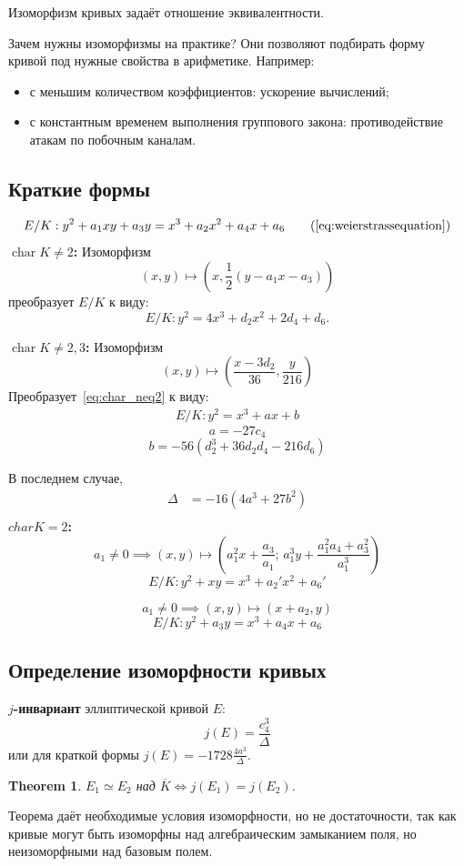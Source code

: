 \documentclass[11pt]{exam}
\newtheorem{theorem}{Theorem}[section]
\theoremstyle{definition}
\begin{document}
{Изоморфизм кривых задаёт отношение эквивалентности.

Зачем нужны изоморфизмы на практике? Они позволяют подбирать форму кривой под нужные свойства в арифметике. Например:
\begin{itemize}
	\item с меньшим количеством коэффициентов: ускорение вычислений;
	\item с константным временем выполнения группового закона: противодействие атакам по побочным каналам.
\end{itemize}

\subsection{Краткие формы}
    \begin{equation*}
	E/K: y^2 + a_1 xy + a_3 y = x^3 + a_2 x^2 + a_4 x + a_6 \tag{\ref{eq:weierstrassequation}}
\end{equation*}
\textbf{$\operatorname{char} K \neq 2$:}
Изоморфизм \[(x, y)\mapsto \left(x, \frac{1}{2}(y-a_1x-a_3)\right)\] преобразует $E/K$ к виду:
\begin{equation}
	\label{eq:char_neq2}
	E/K: y^2 = 4x^3 + d_2x^2 + 2d_4 + d_6.
\end{equation}

\textbf{$\operatorname{char} K \neq 2, 3$:}
Изоморфизм
\[
(x, y) \mapsto \left(\frac{x-3d_2}{36}, \frac{y}{216}\right)
\]
Преобразует~\eqref{eq:char_neq2} к виду:
\begin{align}
	E/K: y^2 = x^3 + ax + b
\end{align}
\[
a = -27 c_4
\]
\[
b = -56(d_2^3 + 36 d_2 d_4 - 216 d_6) 
\]

В последнем случае, 
\begin{align*}
	\Delta &= -16(4a^3 + 27b^2) \\ \nonumber
\end{align*}
\textbf{$char K = 2$:} 
\[
a_1 \neq 0 \implies (x, y) \mapsto \left(a_1^2x+\frac{a_3}{a_1}; \, a_1^3y + \frac{a_1^2a_4+a_3^2}{a_1^3}\right)
\]
\begin{equation}
	E/K: y^2+xy=x^3+a_2'x^2+a_6'
\end{equation}

\[
a_1 \neq 0 \implies (x, y) \mapsto (x+a_2, y)
\]
\begin{equation}
	E/K: y^2+a_3y = x^3+a_4x+a_6
\end{equation}

\subsection{Определение изоморфности кривых}
\textbf{$j$-инвариант} эллиптической кривой $E$:
\[
j(E) = \frac{c_4^3}{\Delta}
\] или для краткой формы  $j(E) = -1728 \frac{4a^3}{\Delta}$.
\begin{theorem}
	$E_1 \simeq E_2$ над $\overline{K} \iff j(E_1)=j(E_2)$.
\end{theorem}
Теорема даёт необходимые условия изоморфности, но не достаточности, так как кривые могут быть изоморфны над алгебраическим замыканием поля, но неизоморфными над базовым полем.

}
\end{document}
